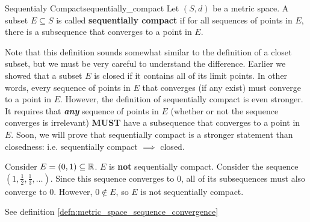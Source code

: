 

\begin{defn}{Sequentialy Compact}{sequentially_compact}
Let \((S, d)\) be a metric space. A subset \(E \subseteq S\) is called \textbf{sequentially compact} if for all sequences of points in \(E\), there is a subsequence that converges to a point in \(E\). \newline 

Note that this definition sounds somewhat similar to the definition of a closet subset, but we must be very careful to understand the difference. Earlier we showed that a subset \(E\)
 is closed if it contains all of its limit points. In other words, every sequence of points in \(E\) that converges (if any exist) must converge to a point in \(E\). However, the definition of sequentially compact is even stronger. It requires that \textbf{\textit{any}} sequence of points in \(E\) (whether or not the sequence converges is irrelevant) \textbf{MUST} have a subsequence that converges to a point in \(E\). Soon, we will prove that sequentially compact is a stronger statement than closedness: i.e. sequentially compact \(\implies\) closed.
 \end{defn}
\begin{exmp}{}{}
Consider \(E = (0, 1) \subseteq {\mathbb R}\). \(E\) is \textbf{not} sequentially compact. Consider the sequence \((1, \frac{1}{2}, \frac{1}{3}, \dots)\). Since this sequence converges to 0, all of its subsequences must also converge to 0. However, \(0 \not \in E\), so \(E\) is not sequentially compact.
\end{exmp}


See definition \ref{defn:metric_space_sequence_convergence}



